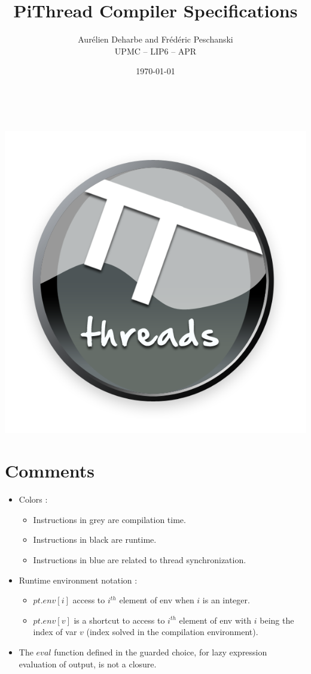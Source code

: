 \documentclass[a4paper,11pt]{article}
\title{PiThread Compiler Specifications}
\date{\today}
\author{Aurélien Deharbe and Fr\'ed\'eric Peschanski\\ UPMC -- LIP6 -- APR}
\newcommand{\compiletime}[1]{\textcolor{compilecolor}{#1}}
\newcommand{\synchro}[1]{\textcolor{synchrocolor}{#1}}
\begin{document}
\renewcommand{\contentsname}{Table of contents}
\maketitle
$ $\newline
$ $\newline
\begin{center}
\includegraphics[scale=0.45]{pithreads.png}
\end{center}
\newpage
\tableofcontents
\newpage

\section{Comments}

\noindent
\begin{itemize}
\item \footnotesize Colors :
  \begin{itemize}
  \item \compiletime{Instructions in grey are compilation time.}
  \item Instructions in black are runtime.
  \item \synchro{Instructions in blue are related to thread synchronization.}
  \end{itemize}
\item \footnotesize Runtime environment notation :
  \begin{itemize}
  \item $pt.env[i]$ access to $i^{th}$ element of env when $i$ is an integer.
  \item $pt.env[v]$ is a shortcut to access to $i^{th}$ element of env with $i$ being the index of var $v$ (index solved in the compilation environment).
  \end{itemize}
\item \footnotesize The $eval$ function defined in the guarded choice, for lazy expression evaluation of output, is not a closure.
\end{itemize}
\end{document}
